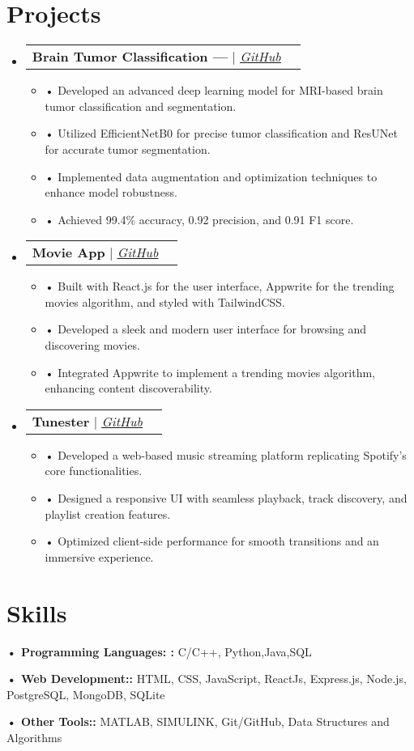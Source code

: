 \documentclass[letterpaper,11pt]{article}
\makeatletter
\newcommand{\resumeItem}[1]{
  \item\small{
    {#1 \vspace{-2pt}}
  }
}
\newcommand{\resumeProjectHeading}[2]{
    \vspace{-2pt}\item
    \begin{tabular*}{0.97\textwidth}{l@{\extracolsep{\fill}}r}
      \small#1 & #2 \\
    \end{tabular*}\vspace{-7pt}
}
\newcommand{\resumeSubHeadingListStart}{\begin{itemize}[leftmargin=0.15in, label={}]}
\newcommand{\resumeSubHeadingListEnd}{\end{itemize}}
\newcommand{\resumeItemListStart}{\begin{itemize}}
\newcommand{\resumeItemListEnd}{\end{itemize}\vspace{-5pt}}
\makeatother
\begin{document}

\section{Projects}
  \vspace{3pt}
  \resumeSubHeadingListStart

  
\resumeProjectHeading
{\textbf{Brain Tumor Classification —} $|$ \underline{\emph{\href{}{GitHub}}} } {}
      \resumeItemListStart
      \resumeItem{• Developed an advanced deep learning model for MRI-based brain tumor classification and segmentation.}\resumeItem{• Utilized EfficientNetB0 for precise tumor classification and ResUNet for accurate tumor segmentation.}\resumeItem{• Implemented data augmentation and optimization techniques to enhance model robustness.}\resumeItem{• Achieved 99.4\% accuracy, 0.92 precision, and 0.91 F1 score.}
        \resumeItemListEnd

\resumeProjectHeading
{\textbf{Movie App} $|$ \underline{\emph{\href{}{GitHub}}} } {}
      \resumeItemListStart
      \resumeItem{• Built with React.js for the user interface, Appwrite for the trending movies algorithm, and styled with TailwindCSS.}\resumeItem{• Developed a sleek and modern user interface for browsing and discovering movies.}\resumeItem{• Integrated Appwrite to implement a trending movies algorithm, enhancing content discoverability.}
        \resumeItemListEnd

\resumeProjectHeading
{\textbf{Tunester} $|$ \underline{\emph{\href{}{GitHub}}} } {}
      \resumeItemListStart
      \resumeItem{• Developed a web-based music streaming platform replicating Spotify’s core functionalities.}\resumeItem{• Designed a responsive UI with seamless playback, track discovery, and playlist creation features.}\resumeItem{• Optimized client-side performance for smooth transitions and an immersive experience.}
        \resumeItemListEnd


  \resumeSubHeadingListEnd




\section{Skills}
  \vspace{2pt}
  \resumeSubHeadingListStart
    \small{\item{

  
    \textbf{• Programming Languages: :}{  C/C++, Python,Java,SQL} \ \vspace{3pt}

    \textbf{• Web Development::}{ HTML, CSS, JavaScript, ReactJs, Express.js, Node.js, PostgreSQL, MongoDB, SQLite} \ \vspace{3pt}

    \textbf{• Other Tools::}{ MATLAB, SIMULINK, Git/GitHub, Data Structures and Algorithms} \ \vspace{3pt}

}}
\resumeSubHeadingListEnd


\end{document}
